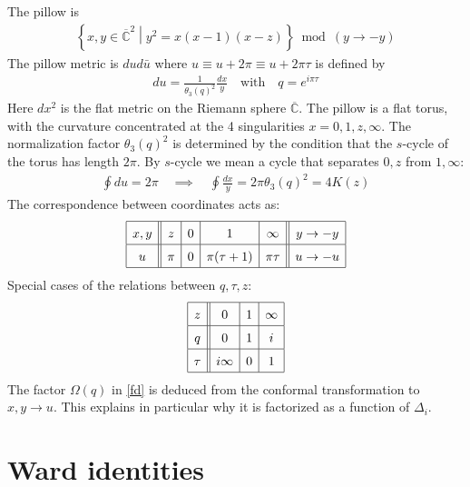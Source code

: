 \documentclass[12pt,a4paper]{article}
\begin{document}
The pillow is 
\begin{align}
 \left\{x,y\in \overline{\mathbb{C}}^2\middle| y^2=x(x-1)(x-z) \right\}\bmod (y\to -y)
\end{align}
The pillow metric is $dud\bar u$ where $u\equiv u+2\pi \equiv u+2\pi\tau$ is defined by 
\begin{align}
 du = \frac{1}{\theta_3(q)^2} \frac{dx}{y} \quad \text{with} \quad q=e^{i\pi\tau}
 \label{dudx}
\end{align}
Here $dx^2$ is the flat metric on the Riemann sphere $\overline{\mathbb{C}}$. The pillow is a flat torus, with the curvature concentrated at the 4 singularities $x=0,1,z,\infty$. The normalization factor $\theta_3(q)^2$ is determined by the condition that the $s$-cycle of the torus has length $2\pi$. By $s$-cycle we mean a cycle that separates $0,z$ from $1,\infty$:
\begin{align}
  \oint du = 2\pi \quad \implies \quad \oint \frac{dx}{y} =  2\pi\theta_3(q)^2 = 4K(z)
\end{align}
The correspondence between coordinates acts as:
\begin{align}
\renewcommand{\arraystretch}{1.5}
 \begin{array}{|c||c|c|c|c||c|}
 \hline 
  x,y & z & 0 & 1 & \infty & y\to -y 
  \\
  \hline 
   u &  \pi & 0 & \pi(\tau+1) & \pi\tau & u \to -u
   \\
   \hline 
 \end{array}
\end{align}
Special cases of the relations between $q,\tau,z$:
\begin{align}
 \renewcommand{\arraystretch}{1.5}
 \begin{array}{|c||c|c|c|}
 \hline 
  z & 0 & 1 & \infty 
  \\
  \hline 
  q & 0 & 1 & i 
  \\
  \hline 
  \tau & i\infty & 0 & 1 
  \\
  \hline 
 \end{array}
\end{align}
The factor $\Omega(q)$ in \eqref{fd} is deduced from the conformal transformation to $x,y\to u$. This explains in particular why it is factorized as a function of $\Delta_i$. 

\section{Ward identities}
\end{document}
